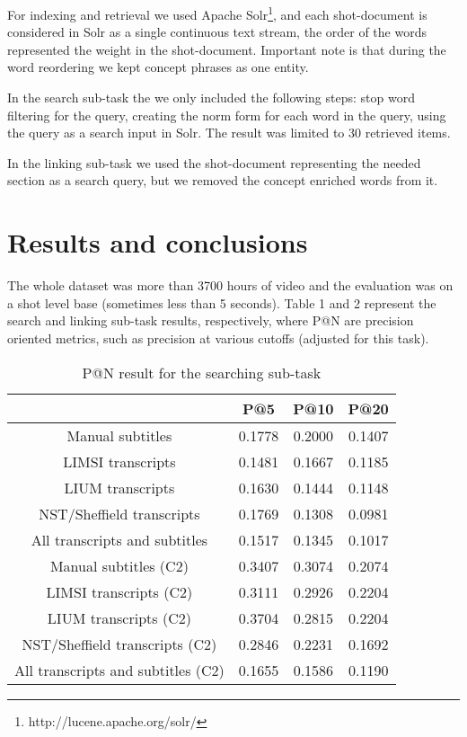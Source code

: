 \documentclass{acm_proc_article-me}
\begin{document}
For indexing and retrieval we used Apache Solr\footnote{http://lucene.apache.org/solr/}, and each shot-document is considered in Solr as a single continuous text stream, the order of the words represented the weight in the shot-document. Important note is that during the word reordering we kept concept phrases as one entity.

In the search sub-task the we only included the following steps: stop word filtering for the query, creating the norm form for each word in the query, using the query as a search input in Solr. The result was limited to 30 retrieved items.

In the linking sub-task we used the shot-document representing the needed section as a search query, but we removed the concept enriched words from it. %

\section{Results and conclusions}

The whole dataset was more than 3700 hours of video and the evaluation was on a shot level base (sometimes less than 5 seconds). Table 1 and 2 represent the search and linking sub-task results, respectively, where P@N are precision oriented metrics, such as precision at various cutoffs (adjusted for this task).\cite{metrics2012}


\begin{table}[h]
\begin{tabular}{|c|c|c|c|}
	\hline 
	& P@5 & P@10 & P@20\tabularnewline
	\hline 
	\hline 
	Manual subtitles & 0.1778 & 0.2000 & 0.1407\tabularnewline
	\hline 
	LIMSI transcripts & 0.1481 & 0.1667 & 0.1185\tabularnewline
	\hline 
	LIUM transcripts & 0.1630 & 0.1444 & 0.1148\tabularnewline
	\hline 
	NST/Sheffield transcripts& 0.1769 & 0.1308 & 0.0981\tabularnewline
	\hline 
	All transcripts and subtitles & 0.1517 & 0.1345 & 0.1017\tabularnewline
	\hline 
	Manual subtitles (C2) & 0.3407 & 0.3074 & 0.2074\tabularnewline
	\hline 
	LIMSI transcripts (C2) & 0.3111 & 0.2926 & 0.2204\tabularnewline
	\hline 
	LIUM transcripts (C2) & 0.3704 & 0.2815 & 0.2204\tabularnewline
	\hline 
	NST/Sheffield transcripts (C2) & 0.2846 & 0.2231 & 0.1692\tabularnewline	
	\hline 
	All transcripts and subtitles (C2) & 0.1655 & 0.1586 & 0.1190\tabularnewline	
	\hline 
\end{tabular}
\caption{P@N result for the searching sub-task}
\end{table}
\end{document}
